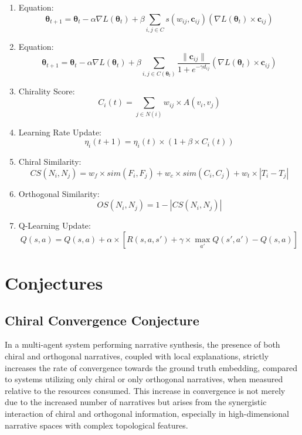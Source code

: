 \documentclass[12pt, a4paper]{article}
\begin{document}
\begin{enumerate}
    \item  Equation:
    \[
    \boldsymbol{\theta}_{t+1} = \boldsymbol{\theta}_t - \alpha \nabla L(\boldsymbol{\theta}_t) + \beta \sum_{i,j \in C} s(w_{ij}, \mathbf{c}_{ij}) (\nabla L(\boldsymbol{\theta}_t) \times \mathbf{c}_{ij})
    \]
    \item Equation:
    \[
    \boldsymbol{\theta}_{t+1} = \boldsymbol{\theta}_t - \alpha \nabla L(\boldsymbol{\theta}_t) + \beta \sum_{i,j \in C(\boldsymbol{\theta}_t)}  \frac{\| \mathbf{c}_{ij} \|}{1 + e^{-\gamma d_{ij}}} (\nabla L(\boldsymbol{\theta}_t) \times \mathbf{c}_{ij})
    \]
    \item Chirality Score:
    \[
    C_i(t) = \sum_{j \in N(i)} w_{ij} \times A(v_i, v_j)
    \]
    \item Learning Rate Update:
    \[
    \eta_i(t+1) = \eta_i(t) \times (1 + \beta \times C_i(t))
    \]
    \item Chiral Similarity:
    \[
    CS(N_i, N_j) = w_f \times sim(F_i, F_j) + w_c \times sim(C_i, C_j) + w_t \times |T_i - T_j|
    \]
    \item Orthogonal Similarity:
    \[
    OS(N_i, N_j) = 1 - |CS(N_i, N_j)|
    \]
    \item Q-Learning Update:
    \[
    Q(s, a) = Q(s, a) + \alpha \times [R(s, a, s') + \gamma \times \max_{a'} Q(s', a') - Q(s, a)]
    \]
\end{enumerate}


\section{Conjectures}

\subsection{Chiral Convergence Conjecture}

In a multi-agent system performing narrative synthesis, the presence of both chiral and orthogonal narratives, coupled with local explanations, strictly increases the rate of convergence towards the ground truth embedding, compared to systems utilizing only chiral or only orthogonal narratives, when measured relative to the resources consumed. This increase in convergence is not merely due to the increased number of narratives but arises from the synergistic interaction of chiral and orthogonal information, especially in high-dimensional narrative spaces with complex topological features.
\end{document}
